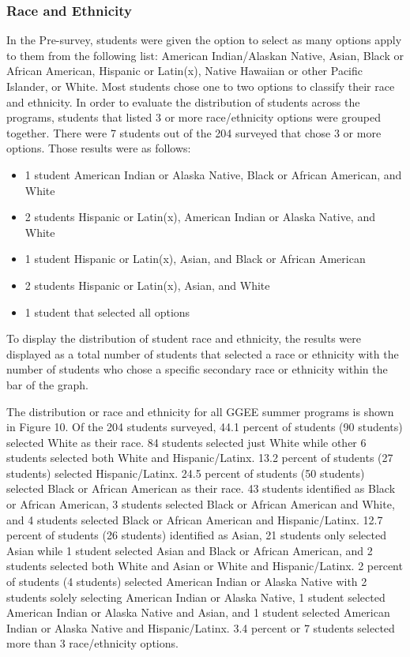 \documentclass[
]{article}
\providecommand{\tightlist}{%
  \setlength{\itemsep}{0pt}\setlength{\parskip}{0pt}}
\begin{document}
\hypertarget{race-and-ethnicity}{%
\subsubsection{Race and Ethnicity}\label{race-and-ethnicity}}

In the Pre-survey, students were given the option to select as many
options apply to them from the following list: American Indian/Alaskan
Native, Asian, Black or African American, Hispanic or Latin(x), Native
Hawaiian or other Pacific Islander, or White. Most students chose one to
two options to classify their race and ethnicity. In order to evaluate
the distribution of students across the programs, students that listed 3
or more race/ethnicity options were grouped together. There were 7
students out of the 204 surveyed that chose 3 or more options. Those
results were as follows:

\begin{itemize}
\tightlist
\item
  1 student American Indian or Alaska Native, Black or African American,
  and White
\item
  2 students Hispanic or Latin(x), American Indian or Alaska Native, and
  White
\item
  1 student Hispanic or Latin(x), Asian, and Black or African American
\item
  2 students Hispanic or Latin(x), Asian, and White
\item
  1 student that selected all options
\end{itemize}

To display the distribution of student race and ethnicity, the results
were displayed as a total number of students that selected a race or
ethnicity with the number of students who chose a specific secondary
race or ethnicity within the bar of the graph.

The distribution or race and ethnicity for all GGEE summer programs is
shown in Figure 10. Of the 204 students surveyed, 44.1 percent of
students (90 students) selected White as their race. 84 students
selected just White while other 6 students selected both White and
Hispanic/Latinx. 13.2 percent of students (27 students) selected
Hispanic/Latinx. 24.5 percent of students (50 students) selected Black
or African American as their race. 43 students identified as Black or
African American, 3 students selected Black or African American and
White, and 4 students selected Black or African American and
Hispanic/Latinx. 12.7 percent of students (26 students) identified as
Asian, 21 students only selected Asian while 1 student selected Asian
and Black or African American, and 2 students selected both White and
Asian or White and Hispanic/Latinx. 2 percent of students (4 students)
selected American Indian or Alaska Native with 2 students solely
selecting American Indian or Alaska Native, 1 student selected American
Indian or Alaska Native and Asian, and 1 student selected American
Indian or Alaska Native and Hispanic/Latinx. 3.4 percent or 7 students
selected more than 3 race/ethnicity options.
\end{document}
